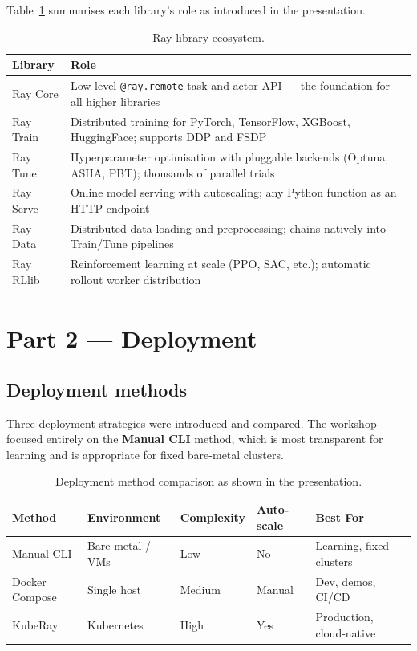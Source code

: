 \documentclass[12pt,a4paper]{article}
\begin{document}
Table~\ref{tab:ecosystem} summarises each library's role as introduced in the
presentation.

\begin{table}[H]
\centering
\caption{Ray library ecosystem.}
\label{tab:ecosystem}
\begin{tabularx}{\textwidth}{lX}
\toprule
\textbf{Library} & \textbf{Role} \\
\midrule
Ray Core  & Low-level \texttt{@ray.remote} task and actor API --- the foundation for all higher libraries \\
Ray Train & Distributed training for PyTorch, TensorFlow, XGBoost, HuggingFace; supports DDP and FSDP \\
Ray Tune  & Hyperparameter optimisation with pluggable backends (Optuna, ASHA, PBT); thousands of parallel trials \\
Ray Serve & Online model serving with autoscaling; any Python function as an HTTP endpoint \\
Ray Data  & Distributed data loading and preprocessing; chains natively into Train/Tune pipelines \\
Ray RLlib & Reinforcement learning at scale (PPO, SAC, etc.); automatic rollout worker distribution \\
\bottomrule
\end{tabularx}
\end{table}

\section{Part 2 --- Deployment}

\subsection{Deployment methods}

Three deployment strategies were introduced and compared. The workshop
focused entirely on the \textbf{Manual CLI} method, which is most
transparent for learning and is appropriate for fixed bare-metal
clusters.

\begin{table}[H]
\centering
\caption{Deployment method comparison as shown in the presentation.}
\label{tab:deploy}
\begin{tabular}{lllll}
\toprule
\textbf{Method} & \textbf{Environment} & \textbf{Complexity} & \textbf{Auto-scale} & \textbf{Best For} \\
\midrule
Manual CLI     & Bare metal / VMs & Low    & No     & Learning, fixed clusters \\
Docker Compose & Single host      & Medium & Manual & Dev, demos, CI/CD \\
KubeRay        & Kubernetes       & High   & Yes    & Production, cloud-native \\
\bottomrule
\end{tabular}
\end{table}
\end{document}
